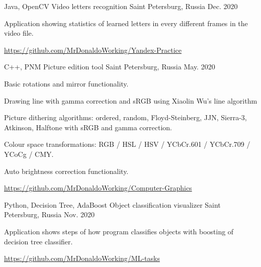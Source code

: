 \begin{cventries}
  \cventry
    {Java, OpenCV}%
    {Video letters recognition} %
    {Saint Petersburg, Russia} %
    {Dec. 2020} %
    {
      \begin{cvitems} %
        \item {Application showing statistics of learned letters in every different frames in the video file.}
        \item {\url {https://github.com/MrDonaldoWorking/Yandex-Practice}}
      \end{cvitems}
    }

  \cventry
    {C++, PNM}%
    {Picture edition tool} %
    {Saint Petersburg, Russia} %
    {May. 2020} %
    {
      \begin{cvitems} %
        \item {Basic rotations and mirror functionality.}
        \item {Drawing line with gamma correction and sRGB using Xiaolin Wu's line algorithm}
        \item {Picture dithering algorithms: ordered, random, Floyd-Steinberg, JJN, Sierra-3, Atkinson, Halftone with sRGB and gamma correction.}
        \item {Colour space transformations: RGB / HSL / HSV / YCbCr.601 / YCbCr.709 / YCoCg / CMY.}
        \item {Auto brightness correction functionality.}
        \item {\url {https://github.com/MrDonaldoWorking/Computer-Graphics}}
      \end{cvitems}
    }
    
  \cventry
    {Python, Decision Tree, AdaBoost}%
    {Object classification visualizer} %
    {Saint Petersburg, Russia} %
    {Nov. 2020} %
    {
      \begin{cvitems} %
        \item {Application shows steps of how program classifies objects with boosting of decision tree classifier.}
        \item {\url {https://github.com/MrDonaldoWorking/ML-tasks}}
      \end{cvitems}
    }


\end{cventries}
